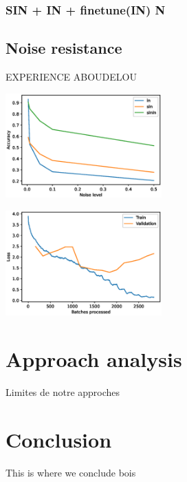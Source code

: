 \documentclass{article}
\begin{document}
\subsubsection{SIN + IN + finetune(IN) \texorpdfstring{\textrightarrow}  IN}


\subsection{Noise resistance}

EXPERIENCE ABOUDELOU

\includegraphics[width = 0.45\textwidth]{imgs/uniform}

\includegraphics[width = 0.45\textwidth]{imgs/sin/loss.eps}

\newpage
\section{Approach analysis}

Limites de notre approches

\newpage
\section{Conclusion}

This is where we conclude bois



\end{document}
